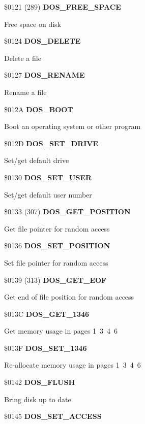 \$0121 (289) \textbf{DOS\_FREE\_SPACE}

Free space on disk

%

\$0124 \textbf{DOS\_DELETE}

Delete a file

\$0127 \textbf{DOS\_RENAME}

Rename a file

\$012A \textbf{DOS\_BOOT}

Boot an operating system or other program

\$012D \textbf{DOS\_SET\_DRIVE}

Set/get default drive

\$0130 \textbf{DOS\_SET\_USER}

Set/get default user number

\$0133 (307) \textbf{DOS\_GET\_POSITION}

Get file pointer for random access


\$0136 \textbf{DOS\_SET\_POSITION}

Set file pointer for random access

\$0139 (313) \textbf{DOS\_GET\_EOF}

Get end of file position for random access

%

\$013C \textbf{DOS\_GET\_1346}

Get memory usage in pages 1\, 3\, 4\, 6

\$013F \textbf{DOS\_SET\_1346}

Re-allocate memory usage in pages 1\, 3\, 4\, 6

\$0142 \textbf{DOS\_FLUSH}

Bring disk up to date

\$0145 \textbf{DOS\_SET\_ACCESS}

